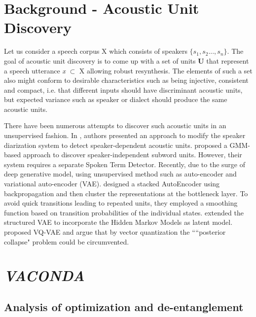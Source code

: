\section{Background - Acoustic Unit Discovery}

Let us consider a speech corpus X which consists of speakers $\{ s_1, s_2...,s_n \}$. The goal of acoustic unit discovery is to come up with a set of units \textbf{U} that represent a speech utterance \textit{x} $\subset$ X allowing robust resynthesis. %
The elements of such a set also might conform to desirable characteristics  such as being injective, consistent and compact, i.e. that different inputs should have discriminant acoustic units, but expected variance such as speaker or dialect should produce the same acoustic units. %


There have been numerous attempts to discover such acoustic units in an unsupervised fashion. In \citep{subword_diarization}, authors presented an approach to modify the speaker diarization system to detect speaker-dependent acoustic units. \citep{unsupervised_AMtraining_ArenJansen} proposed a GMM-based approach to discover speaker-independent subword units. However, their system requires a separate Spoken Term Detector. Recently, due to the surge of deep generative model, using unsupervised method such as auto-encoder and variational auto-encoder (VAE). \citep{badino_autoencoder} designed a stacked AutoEncoder using backpropagation and then cluster the representations at the bottleneck layer. To avoid quick transitions leading to repeated units, they employed a smoothing function based on transition probabilities of the individual states. \citep{hmm-vae_bhiksha} extended the structured VAE to incorporate the Hidden Markov Models as latent model. \citep{vq-vae, chorowski2019unsupervised} proposed VQ-VAE and argue that by vector quantization the ``“posterior collapse" problem could be circumvented.


\section{\textit{VACONDA}}
\label{proposed_approach}


\subsection{Analysis of optimization and de-entanglement}
\label{analysis}

